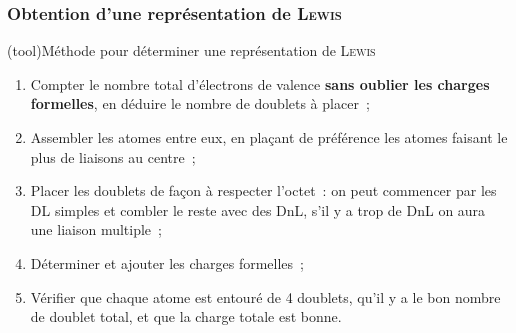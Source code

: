 \documentclass[../../main/main.tex]{subfiles}
\begin{document}
\vspace{-15pt}
\subsubsection{Obtention d'une représentation de \textsc{Lewis}}
\begin{tcb*}(tool){Méthode pour déterminer une représentation de \textsc{Lewis}}
	\begin{enumerate}[label=\sqenumi]
		\item Compter le nombre total d'électrons de valence \textbf{sans oublier
			      les charges formelles}, en déduire le nombre
		      de doublets à placer~;
		\item Assembler les atomes entre eux, en plaçant de préférence les atomes
		      faisant le plus de liaisons au centre~;
		\item Placer les doublets de façon à respecter l'octet~: on peut commencer
		      par les DL simples et combler le reste avec des DnL, s'il y a trop de
		      DnL on aura une liaison multiple~;
		\item Déterminer et ajouter les charges formelles~;
		\item Vérifier que chaque atome est entouré de 4 doublets, qu'il y a le bon
		      nombre de doublet total, et que la charge totale est bonne.
	\end{enumerate}
\end{tcb*}
\end{document}
